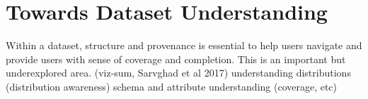 \section{Towards Dataset Understanding}
Within a dataset, structure and provenance is essential to help users navigate and provide users with sense of coverage and completion. This is an important but underexplored area. (viz-sum, Sarvghad et al 2017)
understanding distributions (distribution awareness)
schema and attribute understanding (coverage, etc) 
